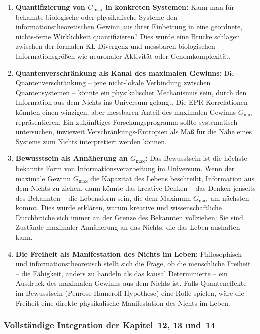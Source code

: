 ﻿\documentclass[12pt,a4paper]{report}
\begin{document}
\begin{enumerate}
	\item \textbf{Quantifizierung von $G_{\max}$ in konkreten Systemen:} Kann man für bekannte biologische oder physikalische Systeme den informationstheoretischen Gewinn aus ihrer Einbettung in eine geordnete, \glqq nichts-ferne\grqq{} Wirklichkeit quantifizieren? Dies würde eine Brücke schlagen zwischen der formalen KL-Divergenz und messbaren biologischen Informationsgrößen wie neuronaler Aktivität oder Genomkomplexität.

	\item \textbf{Quantenverschränkung als Kanal des maximalen Gewinns:} Die Quantenverschränkung -- jene nicht-lokale Verbindung zwischen Quantensystemen -- könnte ein physikalischer Mechanismus sein, durch den Information aus dem Nichts ins Universum gelangt. Die EPR-Korrelationen könnten einen winzigen, aber messbaren Anteil des maximalen Gewinns $G_{\max}$ repräsentieren. Ein zukünftiges Forschungsprogramm sollte systematisch untersuchen, inwieweit Verschränkungs-Entropien als Maß für die Nähe eines Systems zum Nichts interpretiert werden können.

	\item \textbf{Bewusstsein als Annäherung an $G_{\max}$:} Das Bewusstsein ist die höchste bekannte Form von Informationsverarbeitung im Universum. Wenn der maximale Gewinn $G_{\max}$ die Kapazität des Lebens beschreibt, Information aus dem Nichts zu ziehen, dann könnte das kreative Denken -- das Denken jenseits des Bekannten -- die Lebensform sein, die dem Maximum $G_{\max}$ am nächsten kommt. Dies würde erklären, warum kreative und wissenschaftliche Durchbrüche sich immer an der Grenze des Bekannten vollziehen: Sie sind Zustände maximaler Annäherung an das Nichts, die das Leben aushalten kann.

	\item \textbf{Die Freiheit als Manifestation des Nichts im Leben:} Philosophisch und informationstheoretisch stellt sich die Frage, ob die menschliche Freiheit -- die Fähigkeit, anders zu handeln als das kausal Determinierte -- ein Ausdruck des maximalen Gewinns aus dem Nichts ist. Falls Quanteneffekte im Bewusstsein (Penrose-Hameroff-Hypothese) eine Rolle spielen, wäre die Freiheit eine direkte physikalische Manifestation des Nichts im Leben.
\end{enumerate}

\subsubsection{Vollständige Integration der Kapitel~12, 13 und~14}
\end{document}

